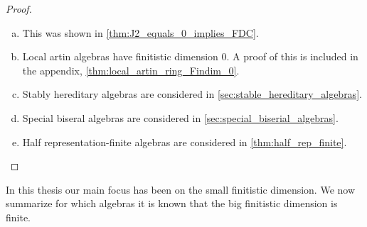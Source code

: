 \begin{theorem}
\begin{proof}
\begin{enumerate}[(a)]
			\item This was shown in \cref{thm:J2_equals_0_implies_FDC}.
			\item Local artin algebras have finitistic dimension 0. A proof of this is included in the appendix, \cref{thm:local_artin_ring_Findim_0}.
			\item Stably hereditary algebras are considered in \cref{sec:stable_hereditary_algebras}.
			\item Special biseral algebras are considered in \cref{sec:special_biserial_algebras}.
			\item Half representation-finite algebras are considered in \cref{thm:half_rep_finite}.
		\end{enumerate}
	\end{proof}
\end{theorem}

In this thesis our main focus has been on the small finitistic dimension. We now summarize for which algebras it is known that the big finitistic dimension is finite.

